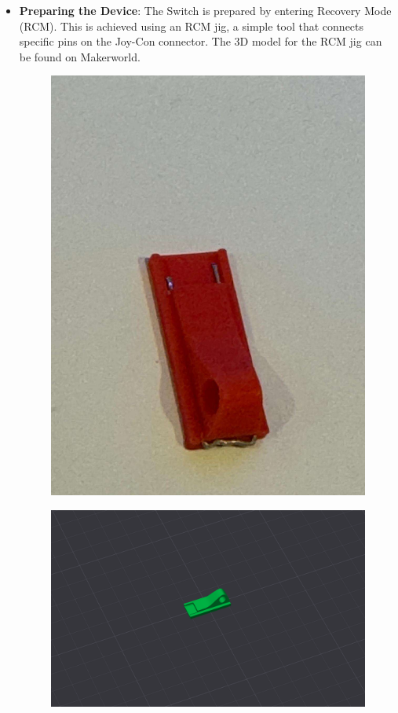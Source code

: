 \begin{itemize}

    \item \textbf{Preparing the Device}: The Switch is prepared by entering Recovery Mode (RCM). This is achieved using an RCM jig, a simple tool that connects specific pins on the Joy-Con connector. The 3D model for the RCM jig can be found on Makerworld.

   \begin{figure}[H]
       \centering
       \begin{minipage}{.5\textwidth}
           \centering
           \includegraphics[width=.8\linewidth]{images/rcm_jig.jpg}
           \label{fig:rcm_jig}
       \end{minipage}%
       \begin{minipage}{.5\textwidth}
           \centering
           \includegraphics[width=.8\linewidth]{images/nintendo_jig.png}
           \label{fig:switch_rcm}
       \end{minipage}
    \end{figure}


\end{itemize}
